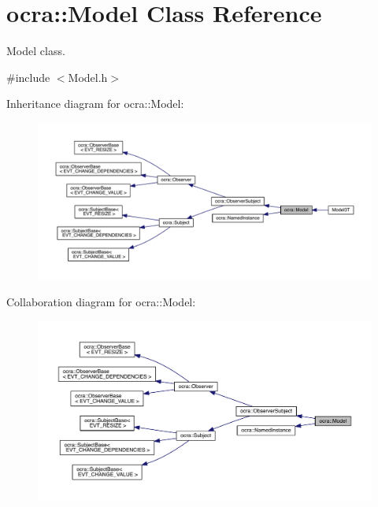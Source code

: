 \hypertarget{classocra_1_1Model}{}\section{ocra\+:\+:Model Class Reference}
\label{classocra_1_1Model}


Model class.  




{\ttfamily \#include $<$Model.\+h$>$}



Inheritance diagram for ocra\+:\+:Model\+:\nopagebreak
\begin{figure}[H]
\begin{center}
\leavevmode
\includegraphics[width=350pt]{dd/d5d/classocra_1_1Model__inherit__graph}
\end{center}
\end{figure}


Collaboration diagram for ocra\+:\+:Model\+:\nopagebreak
\begin{figure}[H]
\begin{center}
\leavevmode
\includegraphics[width=350pt]{d1/d18/classocra_1_1Model__coll__graph}
\end{center}
\end{figure}

